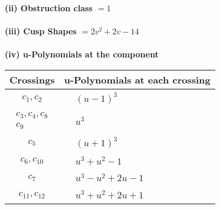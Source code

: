 \documentclass[1p]{elsarticle_modified}
\theoremstyle{definition}
\begin{document}
\flushleft \textbf{(ii) Obstruction class $= 1$}\\~\\
\flushleft \textbf{(iii) Cusp Shapes $= 2 v^2+2 v-14$}\\~\\
\newpage\renewcommand{\arraystretch}{1}
\flushleft \textbf{(iv) u-Polynomials at the component}\newline \\
\begin{tabular}{m{50pt}|m{274pt}}
Crossings & \hspace{64pt}u-Polynomials at each crossing \\
\hline $$\begin{aligned}c_{1},c_{2}\end{aligned}$$&$\begin{aligned}
&(u-1)^3
\end{aligned}$\\
\hline $$\begin{aligned}c_{3},c_{4},c_{8}\\c_{9}\end{aligned}$$&$\begin{aligned}
&u^3
\end{aligned}$\\
\hline $$\begin{aligned}c_{5}\end{aligned}$$&$\begin{aligned}
&(u+1)^3
\end{aligned}$\\
\hline $$\begin{aligned}c_{6},c_{10}\end{aligned}$$&$\begin{aligned}
&u^3+u^2-1
\end{aligned}$\\
\hline $$\begin{aligned}c_{7}\end{aligned}$$&$\begin{aligned}
&u^3- u^2+2 u-1
\end{aligned}$\\
\hline $$\begin{aligned}c_{11},c_{12}\end{aligned}$$&$\begin{aligned}
&u^3+u^2+2 u+1
\end{aligned}$\\
\hline
\end{tabular}\\~\\
\end{document}
